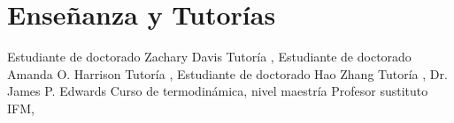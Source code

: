 \section{Enseñanza y Tutorías}

%
{Estudiante de doctorado}%
{Zachary Davis}%
{Tutoría}%
{\DPA, \Purdue}%
{}
%
%
{Estudiante de doctorado}%
{Amanda O. Harrison \textnormal{\cite{RuedaBecerril:2020ha}}}%
{Tutoría}%
{\DPA, \Purdue}%
{}
%
%
{Estudiante de doctorado}%
{Hao Zhang \textnormal{\cite{Zhang:2020ch}}}%
{Tutoría}%
{\DPA, \Purdue}%
{}
%
%
{Dr. James P. Edwards}%
{Curso de termodinámica, nivel maestría}%
{Profesor sustituto}%
{IFM, \UMSNHes}%
{}
